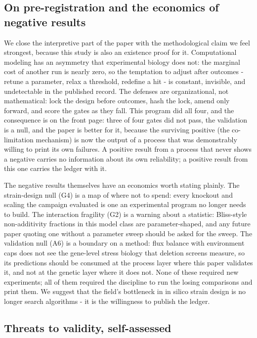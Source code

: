 \documentclass[12pt]{article}
\begin{document}
\subsection{On pre-registration and the economics of negative results}

We close the interpretive part of the paper with the methodological
claim we feel strongest, because this study is also an existence
proof for it. Computational modeling has an asymmetry that
experimental biology does not: the marginal cost of another run is
nearly zero, so the temptation to adjust after outcomes - retune a
parameter, relax a threshold, redefine a hit - is constant, invisible,
and undetectable in the published record. The defenses are
organizational, not mathematical: lock the design before outcomes,
hash the lock, amend only forward, and score the gates as they fall.
This program did all four, and the consequence is on the front page:
three of four gates did not pass, the validation is a null, and the
paper is better for it, because the surviving positive (the
co-limitation mechanism) is now the output of a process that was
demonstrably willing to print its own failures. A positive result
from a process that never shows a negative carries no information
about its own reliability; a positive result from this one carries
the ledger with it.

The negative results themselves have an economics worth stating
plainly. The strain-design null (G4) is a map of where not to spend:
every knockout and scaling the campaign evaluated is one an
experimental program no longer needs to build. The interaction
fragility (G2) is a warning about a statistic: Bliss-style
non-additivity fractions in this model class are parameter-shaped,
and any future paper quoting one without a parameter sweep should be
asked for the sweep. The validation null (A6) is a boundary on a
method: flux balance with environment caps does not see the
gene-level stress biology that deletion screens measure, so its
predictions should be consumed at the process layer where this paper
validates it, and not at the genetic layer where it does not. None of
these required new experiments; all of them required the discipline
to run the losing comparisons and print them. We suggest that the
field's bottleneck in in silico strain design is no longer search
algorithms - it is the willingness to publish the ledger.

\subsection{Threats to validity, self-assessed}
\end{document}
